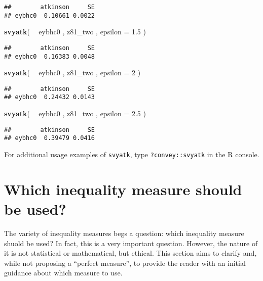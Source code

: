 \documentclass[]{book}
\newenvironment{Shaded}{\begin{snugshade}}{\end{snugshade}}
\newcommand{\DataTypeTok}[1]{\textcolor[rgb]{0.13,0.29,0.53}{#1}}
\newcommand{\DecValTok}[1]{\textcolor[rgb]{0.00,0.00,0.81}{#1}}
\newcommand{\FloatTok}[1]{\textcolor[rgb]{0.00,0.00,0.81}{#1}}
\newcommand{\KeywordTok}[1]{\textcolor[rgb]{0.13,0.29,0.53}{\textbf{#1}}}
\newcommand{\NormalTok}[1]{#1}
\newcommand{\OperatorTok}[1]{\textcolor[rgb]{0.81,0.36,0.00}{\textbf{#1}}}
\newcommand{\StringTok}[1]{\textcolor[rgb]{0.31,0.60,0.02}{#1}}
\begin{document}
\begin{verbatim}
##        atkinson     SE
## eybhc0  0.10661 0.0022
\end{verbatim}

\begin{Shaded}
\begin{Highlighting}[]
\KeywordTok{svyatk}\NormalTok{( }\OperatorTok{~}\StringTok{ }\NormalTok{eybhc0 , z81_two , }\DataTypeTok{epsilon =} \FloatTok{1.5}\NormalTok{ )}
\end{Highlighting}
\end{Shaded}

\begin{verbatim}
##        atkinson     SE
## eybhc0  0.16383 0.0048
\end{verbatim}

\begin{Shaded}
\begin{Highlighting}[]
\KeywordTok{svyatk}\NormalTok{( }\OperatorTok{~}\StringTok{ }\NormalTok{eybhc0 , z81_two , }\DataTypeTok{epsilon =} \DecValTok{2}\NormalTok{ )}
\end{Highlighting}
\end{Shaded}

\begin{verbatim}
##        atkinson     SE
## eybhc0  0.24432 0.0143
\end{verbatim}

\begin{Shaded}
\begin{Highlighting}[]
\KeywordTok{svyatk}\NormalTok{( }\OperatorTok{~}\StringTok{ }\NormalTok{eybhc0 , z81_two , }\DataTypeTok{epsilon =} \FloatTok{2.5}\NormalTok{ )}
\end{Highlighting}
\end{Shaded}

\begin{verbatim}
##        atkinson     SE
## eybhc0  0.39479 0.0416
\end{verbatim}

For additional usage examples of \texttt{svyatk}, type \texttt{?convey::svyatk} in the R console.

\hypertarget{which-inequality-measure-should-be-used}{%
\section{Which inequality measure should be used?}\label{which-inequality-measure-should-be-used}}

The variety of inequality measures begs a question: which inequality measure shuold be used? In fact, this is a very important question. However, the nature of it is not statistical or mathematical, but ethical. This section aims to clarify and, while not proposing a ``perfect measure'', to provide the reader with an initial guidance about which measure to use.
\end{document}
